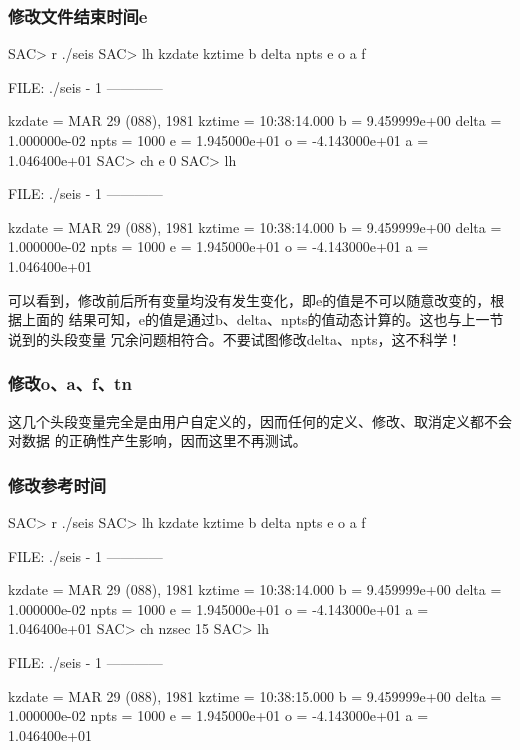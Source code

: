 \subsubsection{修改文件结束时间e}
\begin{SACCode}
SAC> r ./seis
SAC> lh kzdate kztime b delta npts e o a f

  FILE: ./seis - 1
 ------------

     kzdate = MAR 29 (088), 1981
     kztime = 10:38:14.000
          b = 9.459999e+00
      delta = 1.000000e-02
       npts = 1000
          e = 1.945000e+01
          o = -4.143000e+01
          a = 1.046400e+01
SAC> ch e 0
SAC> lh

  FILE: ./seis - 1
 ------------

     kzdate = MAR 29 (088), 1981
     kztime = 10:38:14.000
          b = 9.459999e+00
      delta = 1.000000e-02
       npts = 1000
          e = 1.945000e+01
          o = -4.143000e+01
          a = 1.046400e+01
\end{SACCode}

可以看到，修改前后所有变量均没有发生变化，即e的值是不可以随意改变的，根据上面的
结果可知，e的值是通过b、delta、npts的值动态计算的。这也与上一节说到的头段变量
冗余问题相符合。不要试图修改delta、npts，这不科学！

\subsubsection{修改o、a、f、tn}
这几个头段变量完全是由用户自定义的，因而任何的定义、修改、取消定义都不会对数据
的正确性产生影响，因而这里不再测试。

\subsubsection{修改参考时间}
\begin{SACCode}
SAC> r ./seis
SAC> lh kzdate kztime b delta npts e o a f

  FILE: ./seis - 1
 ------------

     kzdate = MAR 29 (088), 1981
     kztime = 10:38:14.000
          b = 9.459999e+00
      delta = 1.000000e-02
       npts = 1000
          e = 1.945000e+01
          o = -4.143000e+01
          a = 1.046400e+01
SAC> ch nzsec 15
SAC> lh

  FILE: ./seis - 1
 ------------

     kzdate = MAR 29 (088), 1981
     kztime = 10:38:15.000
          b = 9.459999e+00
      delta = 1.000000e-02
       npts = 1000
          e = 1.945000e+01
          o = -4.143000e+01
          a = 1.046400e+01

\end{SACCode}

